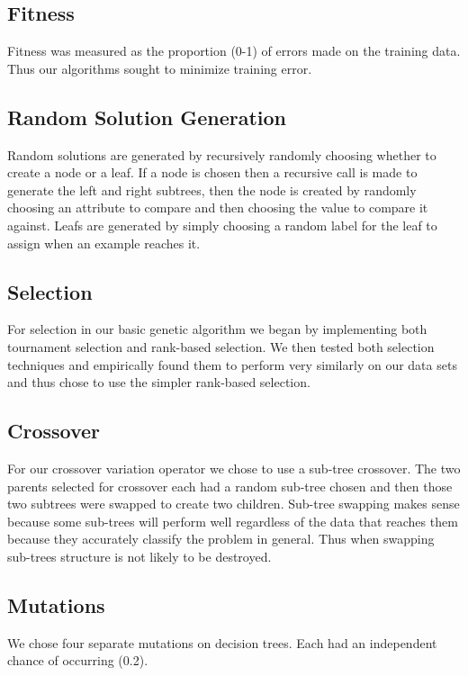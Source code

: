 \documentclass{acm_proc_article-sp}
\begin{document}
\subsection{Fitness}

Fitness was measured as the proportion (0-1) of errors made on the training data. Thus our algorithms sought to minimize training error.

\subsection{Random Solution Generation}

Random solutions are generated by recursively randomly choosing whether to create a node or a leaf. If a node is chosen then a recursive call is made to generate the left and right subtrees, then the node is created by randomly choosing an attribute to compare and then choosing the value to compare it against. Leafs are generated by simply choosing a random label for the leaf to assign when an example reaches it.

\subsection{Selection}

For selection in our basic genetic algorithm we began by implementing both tournament selection and rank-based selection. We then tested both selection techniques and empirically found them to perform very similarly on our data sets and thus chose to use the simpler rank-based selection.

\subsection{Crossover}

For our crossover variation operator we chose to use a sub-tree crossover. The two parents selected for crossover each had a random sub-tree chosen and then those two subtrees were swapped to create two children. Sub-tree swapping makes sense because some sub-trees will perform well regardless of the data that reaches them because they accurately classify the problem in general. Thus when swapping sub-trees structure is not likely to be destroyed.

\subsection{Mutations}

We chose four separate mutations on decision trees. Each had an independent chance of occurring (0.2).
\end{document}
